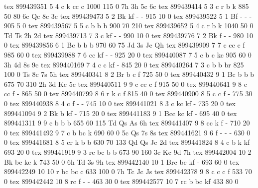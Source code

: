 tex       899439351  5  4 c   k     cc    c         1000  115    0 7h 3h 5c 6c
tex       899439414  5  3 c   r     b     k          885   50   80 6c Qc 8c 3c
tex       899439473  5  2 Bk  kf    -     -          915   10    0 
tex       899439522  5  1 Bf  -     -     -          905    5    0 
tex       899439567  5  5 c   b     b     b          900   70  210 
tex       899439652  5  4 c   r     b     k         1040   50    0 Td Ts 2h 2d
tex       899439713  7  3 c   kf    -     -          990   10    0 
tex       899439776  7  2 Bk  f     -     -          980   10    0 
tex       899439856  6  1 Bc  b     b     b          970   60   75 Jd 3s Jc Qh
tex       899439909  7  7 c   cc    c     f          985   60    0 
tex       899439988  7  6 cc  kf    -     -          925   20    0 
tex       899440087  7  5 c   b     c     kc         905   60    0 3h 4d 8s 9c
tex       899440169  7  4 c   c     kf    -          845   20    0 
tex       899440264  7  3 c   b     b     br         825  100    0 Ts 8c 7s 5h
tex       899440341  8  2 Br  b     c     f          725   50    0 
tex       899440432  9  1 Bc  b     b     b          675   70  310 2h 3d Kc 5c
tex       899440511  9  9 c   cc    c     f          915   50    0 
tex       899440641  9  8 c   cc    f     -          865   50    0 
tex       899440799  8  6 r   k     c     f          815   40    0 
tex       899440900  8  5 c   c     f     -          775   30    0 
tex       899440938  8  4 c   f     -     -          745   10    0 
tex       899441021  8  3 c   kc    kf    -          735   20    0 
tex       899441094  9  2 Bk  b     kf    -          715   20    0 
tex       899441183  9  1 Bcc kc    kf    -          695   40    0 
tex       899441311  9  9 c   b     b     b          655   60  115 Td Qs As 6h
tex       899441407  9  8 cc  k     f     -          710   20    0 
tex       899441492  9  7 c   b     bc    k          690   60    0 5c Qs 7s 8s
tex       899441621  9  6 f   -     -     -          630    0    0 
tex       899441681  8  5 cr  k     b     b          630   70  133 Qd Qs Jc 2d
tex       899441824  8  4 c   b     k     kf         693   20    0 
tex       899441919  9  3 rc  bc    b     b          673   90  160 3c Kc 9d 7h
tex       899442004 10  2 Bk  bc    kc    k          743   50    0 6h Td 3s 9h
tex       899442140 10  1 Brc bc    kf    -          693   60    0 
tex       899442249 10 10 r   bc    bc    c          633  100    0 7h Tc Jc Js
tex       899442378  9  8 c   c     c     f          533   70    0 
tex       899442442 10  8 rc  f     -     -          463   30    0 
tex       899442577 10  7 rc  b     bc    kf         433   80    0 
